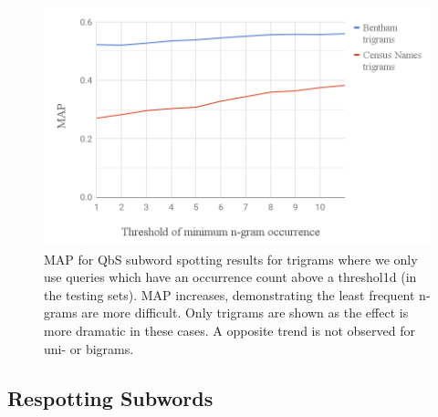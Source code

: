 \documentclass[ms,electronic,twosidetoc,letterpaper,chaptercenter,parttop,lol,lof,lot]{byumsphd}
\begin{document}
\begin{figure}
    \centering
    \includegraphics[width=.75\textwidth]{removengrams}
    \caption{MAP for QbS subword spotting results for trigrams where we only use queries which have an occurrence count above a threshol1d (in the testing sets). MAP increases, demonstrating the least frequent n-grams are more difficult. Only trigrams are shown as the effect is more dramatic in these cases. A opposite trend is not observed for uni- or bigrams.
    }
    \label{fig:remove}
\end{figure}






\subsection{Respotting Subwords}
\end{document}
